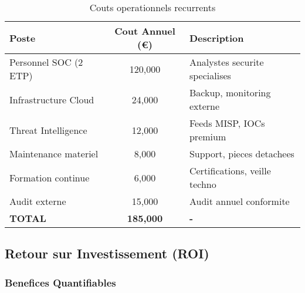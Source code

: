 \begin{table}[H]
    \centering
    \caption{Couts operationnels recurrents}
    \begin{tabular}{|l|c|l|}
        \hline
        \textbf{Poste}        & \textbf{Cout Annuel (€)} & \textbf{Description}           \\
        \hline
        Personnel SOC (2 ETP) & 120,000                  & Analystes securite specialises \\
        \hline
        Infrastructure Cloud  & 24,000                   & Backup, monitoring externe     \\
        \hline
        Threat Intelligence   & 12,000                   & Feeds MISP, IOCs premium       \\
        \hline
        Maintenance materiel  & 8,000                    & Support, pieces detachees      \\
        \hline
        Formation continue    & 6,000                    & Certifications, veille techno  \\
        \hline
        Audit externe         & 15,000                   & Audit annuel conformite        \\
        \hline
        \textbf{TOTAL}        & \textbf{185,000}         & \textbf{-}                     \\
        \hline
    \end{tabular}
\end{table}

\subsection{Retour sur Investissement (ROI)}

\subsubsection{Benefices Quantifiables}

